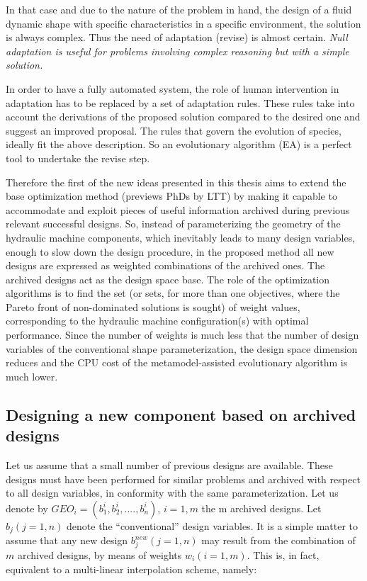In that case and due to the nature of the problem  
in hand, the design of a fluid dynamic shape with specific characteristics in a specific environment, 
the solution is always complex. Thus the need of adaptation (revise) is almost certain.  
\textit{Null adaptation is useful for problems involving complex
reasoning but with a simple solution.}

In order to have a fully automated system, the role of human intervention in adaptation has to be 
replaced by a set of adaptation rules. These rules take into account the derivations of the 
proposed solution compared to the desired one and suggest an improved proposal.
The rules that govern the evolution of species, ideally fit the above description. So an 
evolutionary algorithm (EA) is a perfect tool to undertake the revise step. 

Therefore the first of the new ideas presented in this thesis aims to extend the base optimization method (previews PhDs by LTT) by making it capable to accommodate and exploit pieces of useful information archived during previous relevant successful designs. So, instead of parameterizing the geometry of the hydraulic machine components, which inevitably leads to many design variables, enough to slow down the design procedure, in the proposed method all new designs are expressed as weighted combinations of the archived ones. The archived designs act as the design space base. The role of the optimization algorithms is to find the set (or sets, for more than one objectives, where the Pareto front of non-dominated solutions is sought) of weight values, corresponding to the hydraulic machine configuration(s) with optimal performance. Since the number of weights is much less that the number of design variables of the conventional shape parameterization, the design space dimension reduces and the CPU cost of the metamodel-assisted evolutionary algorithm is much lower.

\subsection{Designing a new component based on archived designs}
Let us assume that a small number of previous designs are available. These designs must have been performed for similar problems and archived with respect to all design variables, in conformity with the same parameterization. Let us denote by $GEO_i=(b_1^i,b_2^i,....,b_n^i)$, $i=1,m$ the m archived designs. Let $b_j (j=1,n)$ denote the “conventional” design variables. It is a simple matter to assume that any new design $b_j^{new} (j=1,n)$ may result from the combination of $m$ archived designs, by means of weights $w_i (i=1,m)$. This is, in fact, equivalent to a multi-linear interpolation scheme, namely:

